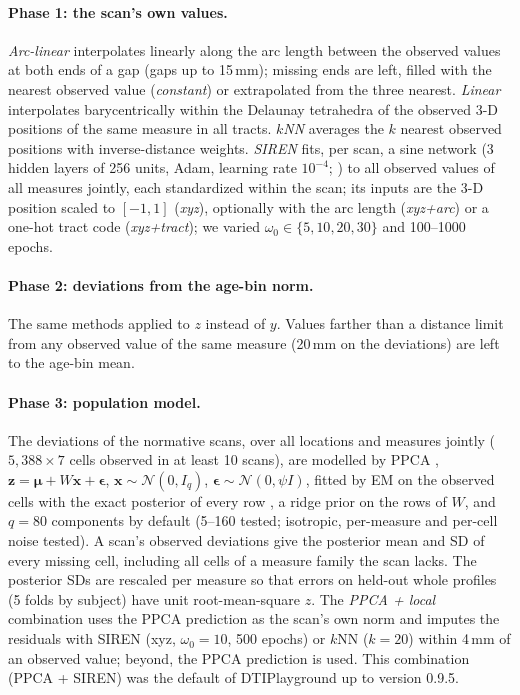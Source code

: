 \documentclass[11pt]{article}
\begin{document}
\paragraph{Phase 1: the scan's own values.} \emph{Arc-linear} interpolates linearly along the arc length between the
observed values at both ends of a gap (gaps up to 15\,mm); missing ends are left, filled with the nearest observed
value (\emph{constant}) or extrapolated from the three nearest. \emph{Linear} interpolates barycentrically within the
Delaunay tetrahedra of the observed 3-D positions of the same measure in all tracts. \emph{$k$NN} averages the $k$
nearest observed positions with inverse-distance weights. \emph{SIREN} \citep{sitzmann2020siren} fits, per scan, a sine
network (3 hidden layers of 256 units, Adam, learning rate $10^{-4}$; \citealp{kingma2015adam}) to all observed values
of all measures jointly, each standardized within the scan; its inputs are the 3-D position scaled to $[-1,1]$
(\emph{xyz}), optionally with the arc length (\emph{xyz+arc}) or a one-hot tract code (\emph{xyz+tract}); we varied
$\omega_0\in\{5,10,20,30\}$ and 100--1000 epochs.

\paragraph{Phase 2: deviations from the age-bin norm.} The same methods applied to $z$ instead of $y$. Values farther
than a distance limit from any observed value of the same measure (20\,mm on the deviations) are left to the age-bin
mean.

\paragraph{Phase 3: population model.} The deviations of the normative scans, over all locations and measures jointly
($5{,}388\times7$ cells observed in at least 10 scans), are modelled by PPCA \citep{tipping1999ppca},
$\mathbf z=\boldsymbol\mu+W\mathbf x+\boldsymbol\epsilon$, $\mathbf x\sim\mathcal N(0,I_q)$,
$\boldsymbol\epsilon\sim\mathcal N(0,\psi I)$, fitted by EM on the observed cells with the exact posterior of every row
\citep{ilin2010pca}, a ridge prior on the rows of $W$, and $q=80$ components by default (5--160 tested; isotropic,
per-measure and per-cell noise tested). A scan's observed deviations give the posterior mean and SD of every missing
cell, including all cells of a measure family the scan lacks. The posterior SDs are rescaled per measure so that
errors on held-out whole profiles (5 folds by subject) have unit root-mean-square $z$. The \emph{PPCA + local}
combination uses the PPCA prediction as the scan's own norm and imputes the residuals with SIREN (xyz, $\omega_0=10$,
500 epochs) or $k$NN ($k=20$) within 4\,mm of an observed value; beyond, the PPCA prediction is used. This combination
(PPCA + SIREN) was the default of DTIPlayground up to version 0.9.5.
\end{document}
